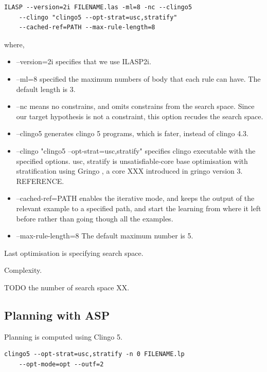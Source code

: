 
\begin{lstlisting}[]
    ILASP --version=2i FILENAME.las -ml=8 -nc --clingo5 
    --clingo "clingo5 --opt-strat=usc,stratify" 
    --cached-ref=PATH --max-rule-length=8
\end{lstlisting}

where,
\begin{itemize}
\item \textsf{--version=2i} specifies that we use ILASP2i.
\item \textsf{--ml=8} specified the maximum numbers of body that each rule can have. The default length is 3.
\item \textsf{--nc} means no constrains, and omits constrains from the search space. Since our target hypothesis is not a constraint, this option recudes the search space.
\item \textsf{--clingo5} generates clingo 5 programs, which is fater, instead of clingo 4.3.
\item \textsf{--clingo "clingo5 --opt-strat=usc,stratify"} specifies clingo executable with the specified options. 
\textsf{usc, stratify} is unsatisfiable-core base optimisation with stratification using Gringo \cite{gringo}, a core XXX introduced in gringo version 3. REFERENCE.
\item \textsf{--cached-ref=PATH} enables the iterative mode, and keeps the output of the relevant example to a specified path, and start the learning from where it left before rather than going though all the examples.
\item \textsf{--max-rule-length=8} The default maximum number is 5.
\end{itemize}

Last optimisation is specifying search space.

Complexity. 

TODO the number of search space XX. 

\subsection{Planning with ASP}
Planning is computed using Clingo 5.

\begin{lstlisting}[]
    clingo5 --opt-strat=usc,stratify -n 0 FILENAME.lp
    --opt-mode=opt --outf=2
\end{lstlisting}


